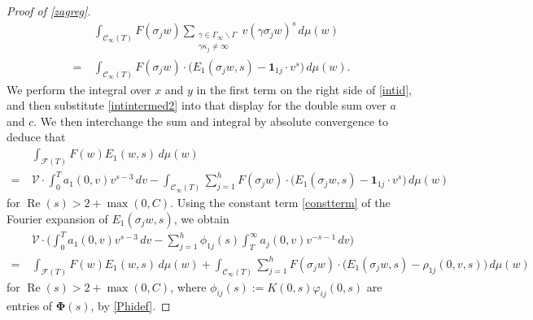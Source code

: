 \documentclass[12pt,reqno]{amsart}
\numberwithin{equation}{section}
\renewcommand{\Re}{\operatorname{Re}}
\begin{document}
\begin{proof}[Proof of \cref{zagreg}]
\begin{align}
    &\int_{\mathcal{C}_{\infty}(T)} F(\sigma_{j} w) \sum_{\substack{\gamma \in \Gamma_{\infty} \backslash \Gamma \\ \gamma \kappa_{j} \neq \infty } } v(\gamma \sigma_{j} w)^{s} \, d \mu(w) \nonumber \\
    = \ & \int_{\mathcal{C}_{\infty}(T)} F(\sigma_{j} w) \cdot \big (E_{1}(\sigma_{j}w,s) - \mathbf{1}_{1 j} \cdot v^s \big) \, d\mu(w).
\end{align}
We perform the integral over $x$ and $y$ in the first term on the right side of \eqref{intid}, and then substitute \eqref{intintermed2} into that display for the double sum over $a$ and $c$. We then interchange the sum and integral by absolute convergence to deduce that 
\begin{align*}
    &\int_{\mathcal{F}(T) } F(w) E_{1}(w,s) \, d \mu(w) \\
    = \ & \mathcal{V} \cdot \int_{0}^{T} a_{1}(0,v) v^{s-3} \, dv -\int_{\mathcal{C}_{\infty}(T)} \sum_{j=1}^h F(\sigma_{j} w) \cdot \big(E_{1}(\sigma_{j}w,s) -\mathbf{1}_{1 j} \cdot v^s \big) \,  d \mu(w)
\end{align*}
for $\Re(s)>2+\max(0,C)$. Using the constant term \eqref{constterm} of the Fourier expansion of $E_{1}(\sigma_{j}w,s)$, we obtain 
\begin{align} \label{rearrange2}
    & \mathcal{V} \cdot  \Big(  \int_{0}^T a_{1}(0,v) v^{s-3} \, dv - \sum_{j=1}^{h} \phi_{1 j}(s) \int_{T}^{\infty} a_{j}(0,v) v^{-s-1} \, dv \Big) \\
    = \ & \int_{\mathcal{F}(T)} F(w) E_{1}(w,s) \, d \mu(w)+ \int_{\mathcal{C}_{\infty}(T)} \sum_{j=1}^{h} F(\sigma_{j} w) \cdot \big(E_{1}(\sigma_{j} w,s)-\rho_{1 j}(0,v,s) \big) \, d \mu(w) \nonumber
\end{align}  
for $\Re(s)>2+\max(0,C)$, where $\phi_{ij}(s) := K(0, s) \varphi_{ij}(0, s)$ are entries of $\mathbf{\Phi}(s)$, by \eqref{Phidef}.


\end{proof}
\end{document}
